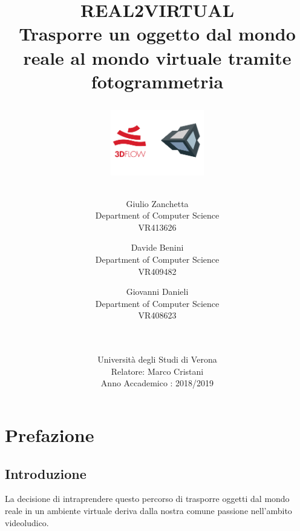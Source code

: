 \documentclass[12pt]{report}
\title{\textbf{REAL2VIRTUAL} \\
    \large Trasporre un oggetto dal mondo reale al mondo virtuale tramite fotogrammetria
    \begin{figure}[h!]
  \centering
  \includegraphics[width=41mm]{img/home_1.png}
\end{figure}
}
\author{Giulio Zanchetta\\
        Department of Computer Science\\
        VR413626\\
            \and
        Davide Benini\\
        Department of Computer Science\\
        VR409482\\
            \and
        Giovanni Danieli\\
        Department of Computer Science\\
        VR408623\\
            \and
            \\
            \\
        Università degli Studi di Verona\\
        Relatore: Marco Cristani\\
        Anno Accademico : 2018/2019
}
\begin{document}
\addtolength{\topmargin}{-30mm}
\thispagestyle{empty}
\date{}
\maketitle
{}

\hypersetup{linkcolor  = black}
\tableofcontents
{}
\hypersetup{linkcolor  = blue}
\addtolength{\topmargin}{15mm}
\chapter{Prefazione}
\section{Introduzione}
La decisione di intraprendere questo percorso di trasporre oggetti dal mondo reale in un ambiente virtuale deriva dalla nostra comune passione nell'ambito videoludico. %
\end{document}
